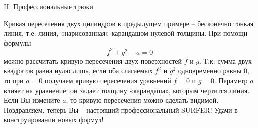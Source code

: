 \documentclass[ru]{./../../common/SurferDesc}%
\begin{document}
\footnotesize
%

 
 \begin{surferPage}
  \begin{surferTitle}II. Профессиональные трюки\end{surferTitle}
   \begin{surferText}

Кривая пересечения двух цилиндров в предыдущем примере – бесконечно тонкая линия, т.е. линия, «нарисованная» карандашом нулевой толщины. При помощи формулы
\[ f^2+g^2-a=0\]
можно рассчитать кривую пересечения двух поверхностей $f$ и $g$. Т.к. сумма двух квадратов равна нулю лишь, если оба слагаемых $f^2$ и $g^2$ одновременно равны $0$, то при $a = 0$ получаем кривую пересечения уравнений $f=0$ и $g=0$. Параметр $a$ влияет на уравнение: он задает толщину «карандаша», которым чертится линия. Если Вы измените $a$, то кривую пересечения можно сделать видимой.
\newline \newline
Поздравляем, теперь Вы – настоящий профессиональный SURFER! Удачи в конструировании новых формул!

     \end{surferText}
\end{surferPage}

\end{document}

